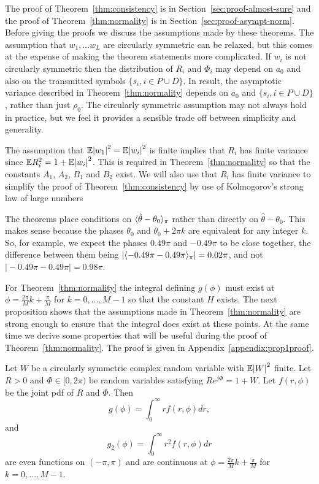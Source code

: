 \documentclass[journal]{IEEEtran}
\begin{document}
The proof of Theorem~\ref{thm:consistency} is in Section~\ref{sec:proof-almost-sure} and the proof of Theorem~\ref{thm:normality} is in Section~\ref{sec:proof-asympt-norm}.  Before giving the proofs we discuss the assumptions made by these theorems.  The assumption that $w_1, \dots w_L$ are circularly symmetric can be relaxed, but this comes at the expense of making the theorem statements more complicated.  If $w_i$ is not circularly symmetric then the distribution of $R_i$ and $\Phi_i$ may depend on $a_0$ and also on the transmitted symbols $\{s_i,i \in P \cup D\}$.  In result, the asymptotic variance described in Theorem~\ref{thm:normality} depends on $a_0$ and $\{s_i,i \in P \cup D\}$, rather than just $\rho_0$.  The circularly symmetric assumption may not always hold in practice, but we feel it provides a sensible trade off between simplicity and generality.  

The assumption that ${\mathbb E} {\vert w_1 \vert}^2 = {\mathbb E} {\vert w_i \vert}^2$ is finite implies that $R_i$ has finite variance since ${\mathbb E} R_i^2 = 1 + {\mathbb E} {\left\vert w_i \right\vert}^2$.  This is required in Theorem~\ref{thm:normality} so that the constants $A_1$, $A_2$, $B_1$ and $B_2$ exist.  We will also use that $R_i$ has finite variance to simplify the proof of Theorem~\ref{thm:consistency} by use of Kolmogorov's strong law of large numbers~\cite[Theorem 2.3.10]{SenSinger_large_sample_stats_1993}


The theorems place conditions on $\langle \hat{\theta} - \theta_0 \rangle_\pi$ rather than directly on $\hat{\theta} - \theta_0$.  This makes sense because the phases $\theta_0$ and $\theta_0 + 2\pi k$ are equivalent for any integer $k$. So, for example, we expect the phases $0.49\pi$ and $-0.49\pi$ to be close together, the difference between them being $\vert\langle -0.49\pi - 0.49\pi \rangle_\pi\vert = 0.02\pi$, and not $\vert -0.49\pi - 0.49\pi\vert = 0.98\pi$.

For Theorem~\ref{thm:normality} the integral defining $g(\phi)$ must exist at $\phi = \tfrac{2\pi}{M}k + \frac{\pi}{M}$ for $k = 0, \dots, M-1$ so that the constant $H$ exists.  The next proposition shows that the assumptions made in Theorem~\ref{thm:normality} are strong enough to ensure that the integral does exist at these points.  At the same time we derive some properties that will be useful during the proof of Theorem~\ref{thm:normality}.  The proof is given in Appendix~\ref{appendix:prop1proof}.

\begin{proposition}\label{prop:gg2cont}
Let $W$ be a circularly symmetric complex random variable with ${\mathbb E}{\left\vert W \right\vert}^2$ finite.  Let $R > 0$ and $\Phi \in [0, 2\pi)$ be random variables satisfying $R e^{j\Phi} = 1 + W$.  Let $f(r,\phi)$ be the joint pdf of $R$ and $\Phi$.  Then
\[
g(\phi) = \int_{0}^\infty r f(r, \phi) dr,
\]
and
\[
g_2(\phi) = \int_{0}^\infty r^2 f(r, \phi) dr
\]
are even functions on $(-\pi,\pi)$ and are continuous at $\phi = \tfrac{2\pi}{M}k + \frac{\pi}{M}$ for $k = 0, \dots, M-1$.
\end{proposition}
\end{document}
